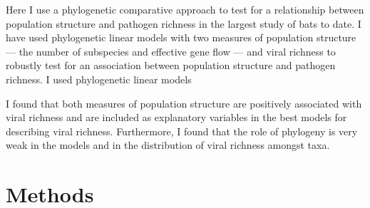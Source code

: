 

Here I use a phylogenetic comparative approach to test for a relationship between population structure and pathogen richness in the largest study of bats to date. 
I have used phylogenetic linear models with two measures of population structure --- the number of subspecies and effective gene flow --- and viral richness to robustly test for an association between population structure and pathogen richness.
I used phylogenetic linear models


I found that both measures of population structure are positively associated with viral richness and are included as explanatory variables in the best models for describing viral richness.
Furthermore, I found that the role of phylogeny is very weak in the models and in the distribution of viral richness amongst taxa.



\section{Methods}

